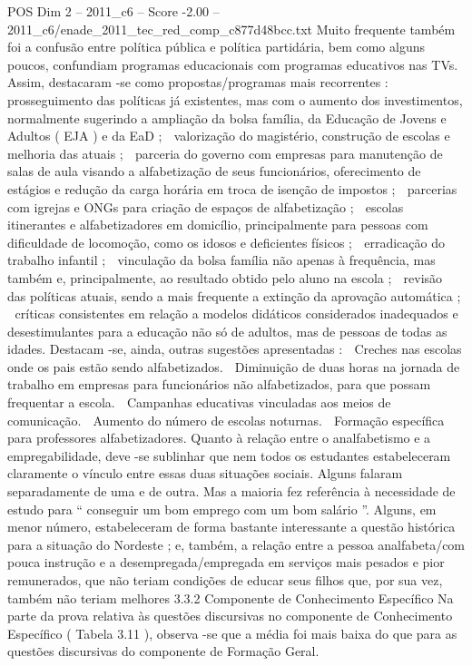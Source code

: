 \begin{textsample}{POS Dim 2 – 2011\_c6 – Score -2.00 – 2011\_c6/enade\_2011\_tec\_red\_comp\_c877d48bcc.txt}
Muito frequente também foi a confusão entre política pública e política partidária, bem como alguns poucos, confundiam programas educacionais com programas educativos nas TVs.
Assim, destacaram -se como propostas/programas mais recorrentes :  prosseguimento das políticas já existentes, mas com o aumento dos investimentos, normalmente sugerindo a ampliação da bolsa família, da Educação de Jovens e Adultos ( EJA ) e da EaD ;  valorização do magistério, construção de escolas e melhoria das atuais ;  parceria do governo com empresas para manutenção de salas de aula visando a alfabetização de seus funcionários, oferecimento de estágios e redução da carga horária em troca de isenção de impostos ;  parcerias com igrejas e ONGs para criação de espaços de alfabetização ;  escolas itinerantes e alfabetizadores em domicílio, principalmente para pessoas com dificuldade de locomoção, como os idosos e deficientes físicos ;  erradicação do trabalho infantil ;  vinculação da bolsa família não apenas à frequência, mas também e, principalmente, ao resultado obtido pelo aluno na escola ;  revisão das políticas atuais, sendo a mais frequente a extinção da aprovação automática ;  críticas consistentes em relação a modelos didáticos considerados inadequados e desestimulantes para a educação não só de adultos, mas de pessoas de todas as idades.
Destacam -se, ainda, outras sugestões apresentadas :  Creches nas escolas onde os pais estão sendo alfabetizados.  Diminuição de duas horas na jornada de trabalho em empresas para funcionários não alfabetizados, para que possam frequentar a escola.  Campanhas educativas vinculadas aos meios de comunicação.  Aumento do número de escolas noturnas.  Formação específica para professores alfabetizadores.
Quanto à relação entre o analfabetismo e a empregabilidade, deve -se sublinhar que nem todos os estudantes estabeleceram claramente o vínculo entre essas duas situações sociais.
Alguns falaram separadamente de uma e de outra.
Mas a maioria fez referência à necessidade de estudo para “ conseguir um bom emprego com um bom salário ”.
Alguns, em menor número, estabeleceram de forma bastante interessante a questão histórica para a situação do Nordeste ; e, também, a relação entre a pessoa analfabeta/com pouca instrução e a desempregada/empregada em serviços mais pesados e pior remunerados, que não teriam condições de educar seus filhos que, por sua vez, também não teriam melhores 3.3.2 Componente de Conhecimento Específico Na parte da prova relativa às questões discursivas no componente de Conhecimento Específico ( Tabela 3.11 ), observa -se que a média foi mais baixa do que para as questões discursivas do componente de Formação Geral.

\end{textsample}

